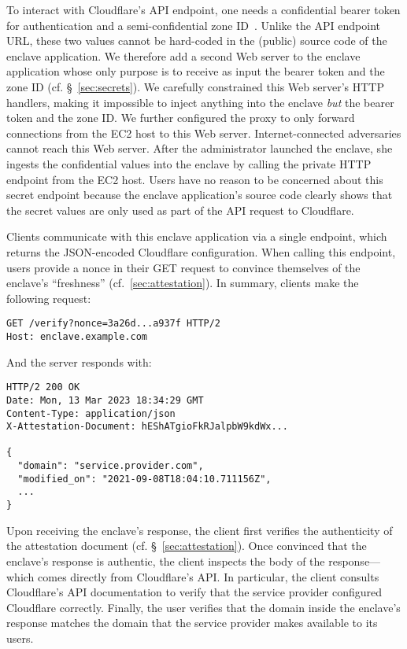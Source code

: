 To interact with Cloudflare's API endpoint, one needs a confidential bearer
token for authentication and a semi-confidential zone
ID~\cite{spectrum-config}.  Unlike the API endpoint URL, these two values
cannot be hard-coded in the (public) source code of the enclave application.
We therefore add a second Web server to the enclave application whose only
purpose is to receive as input the bearer token and the zone ID (cf.
\S~\ref{sec:secrets}).  We carefully constrained this Web server's HTTP
handlers, making it impossible to inject anything into the enclave \emph{but}
the bearer token and the zone ID.  We further configured the proxy to only
forward connections from the EC2 host to this Web server.  Internet-connected
adversaries cannot reach this Web server.  After the administrator launched the
enclave, she ingests the confidential values into the enclave by calling the
private HTTP endpoint from the EC2 host.  Users have no reason to be concerned
about this secret endpoint because the enclave application's source code
clearly shows that the secret values are only used as part of the API request
to Cloudflare.

Clients communicate with this enclave application via a single endpoint, which
returns the JSON-encoded Cloudflare configuration.  When calling this endpoint,
users provide a nonce in their GET request to convince themselves of the
enclave's ``freshness'' (cf.~\ref{sec:attestation}).  In summary, clients make
the following request:


\begin{lstlisting}[numbers=none,basicstyle=\small\ttfamily]
GET /verify?nonce=3a26d...a937f HTTP/2
Host: enclave.example.com
\end{lstlisting}

And the server responds with:

\begin{lstlisting}[numbers=none,basicstyle=\small\ttfamily]
HTTP/2 200 OK
Date: Mon, 13 Mar 2023 18:34:29 GMT
Content-Type: application/json
X-Attestation-Document: hEShATgioFkRJalpbW9kdWx...

{
  "domain": "service.provider.com",
  "modified_on": "2021-09-08T18:04:10.711156Z",
  ...
}
\end{lstlisting}

Upon receiving the enclave's response, the client first verifies the
authenticity of the attestation document (cf. \S~\ref{sec:attestation}).  Once
convinced that the enclave's response is authentic, the client inspects the
body of the response---which comes directly from Cloudflare's API.  In
particular, the client consults Cloudflare's API documentation to verify that
the service provider configured Cloudflare correctly.  Finally, the user
verifies that the domain inside the enclave's response matches the domain that
the service provider makes available to its users.

